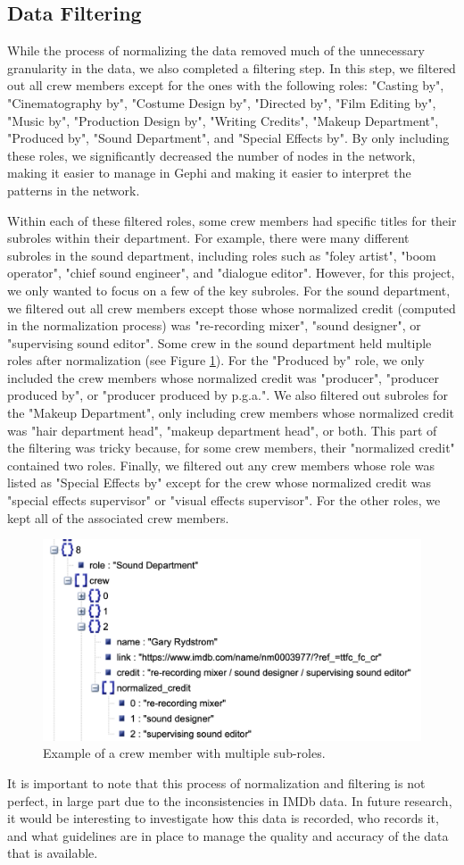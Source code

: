 \documentclass[12pt]{article}
\begin{document}
\subsection*{Data Filtering}
While the process of normalizing the data removed much of the unnecessary granularity in the data, we also completed a filtering step. In this step, we filtered out all crew members except for the ones with the following roles: "Casting by", "Cinematography by", "Costume Design by", "Directed by", "Film Editing by", "Music by", "Production Design by", "Writing Credits", "Makeup Department", "Produced by", "Sound Department", and "Special Effects by". By only including these roles, we significantly decreased the number of nodes in the network, making it easier to manage in Gephi and making it easier to interpret the patterns in the network.
\par
Within each of these filtered roles, some crew members had specific titles for their subroles within their department. For example, there were many different subroles in the sound department, including roles such as "foley artist", "boom operator", "chief sound engineer", and "dialogue editor". However, for this project, we only wanted to focus on a few of the key subroles. For the sound department, we filtered out all crew members except those whose normalized credit (computed in the normalization process) was "re-recording mixer", "sound designer", or "supervising sound editor". Some crew in the sound department held multiple roles after normalization (see Figure \ref{fig:soundRoles}). For the "Produced by" role, we only included the crew members whose normalized credit was "producer", "producer produced by", or "producer produced by p.g.a.". We also filtered out subroles for the "Makeup Department", only including crew members whose normalized credit was "hair department head", "makeup department head", or both. This part of the filtering was tricky because, for some crew members, their "normalized credit" contained two roles. Finally, we filtered out any crew members whose role was listed as "Special Effects by" except for the crew whose normalized credit was "special effects supervisor" or "visual effects supervisor". For the other roles, we kept all of the associated crew members.
\begin{figure}
    \centering
    \includegraphics[width=0.5\linewidth]{soundRoles.png}
    \caption{Example of a crew member with multiple sub-roles.}
    \label{fig:soundRoles}
\end{figure}
\par
It is important to note that this process of normalization and filtering is not perfect, in large part due to the inconsistencies in IMDb data. In future research, it would be interesting to investigate how this data is recorded, who records it, and what guidelines are in place to manage the quality and accuracy of the data that is available.
\end{document}
